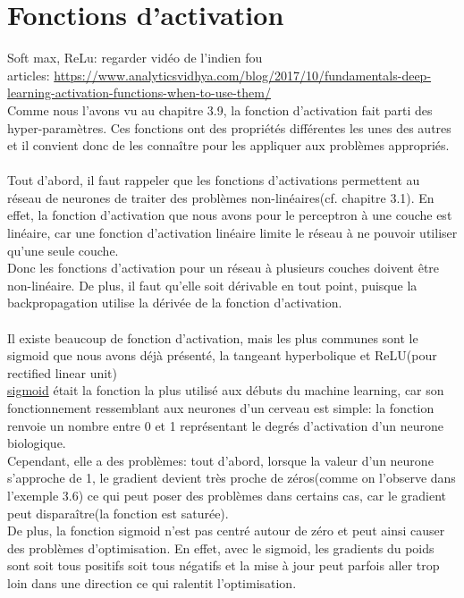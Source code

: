 \documentclass[openany,14pt,fleqn]{book} %
\begin{document}
\section{Fonctions d'activation}
Soft max, ReLu: regarder vidéo de l'indien fou\\
articles: \url{https://www.analyticsvidhya.com/blog/2017/10/fundamentals-deep-learning-activation-functions-when-to-use-them/}\\
Comme nous l'avons vu au chapitre 3.9, la fonction d'activation fait parti des hyper-paramètres. Ces fonctions ont des propriétés différentes les unes des autres et il convient donc de les connaître pour les appliquer aux problèmes appropriés.\\\\
Tout d'abord, il faut rappeler que les fonctions d'activations permettent au réseau de neurones de traiter des problèmes non-linéaires(cf. chapitre 3.1). En effet, la fonction d'activation que nous avons pour le perceptron à une couche est linéaire, car une fonction d'activation linéaire limite le réseau à ne pouvoir utiliser qu'une seule couche.\\ 
Donc les fonctions d'activation pour un réseau à plusieurs couches doivent être non-linéaire. De plus, il faut qu'elle soit dérivable en tout point, puisque la backpropagation utilise la dérivée de la fonction d'activation.\\\\ 
Il existe beaucoup de fonction d'activation, mais les plus communes sont le sigmoid que nous avons déjà présenté, la tangeant hyperbolique et ReLU(pour rectified linear unit)\\
\underline{sigmoid} était la fonction la plus utilisé aux débuts du machine learning, car son fonctionnement ressemblant aux neurones d'un cerveau est simple: la fonction renvoie un nombre entre 0 et 1 représentant le degrés d'activation d'un neurone biologique.\\
Cependant, elle a des problèmes: tout d'abord, lorsque la valeur d'un neurone s'approche de 1, le gradient devient très proche de zéros(comme on l'observe dans l'exemple 3.6) ce qui peut poser des problèmes dans certains cas, car le gradient peut disparaître(la fonction est saturée).\\
De plus, la fonction sigmoid n'est pas centré autour de zéro et peut ainsi causer des problèmes d'optimisation. En effet, avec le sigmoid, les gradients du poids sont soit tous positifs soit tous négatifs et la mise à jour peut parfois aller trop loin dans une direction ce qui ralentit l'optimisation.\\\\
\end{document}
